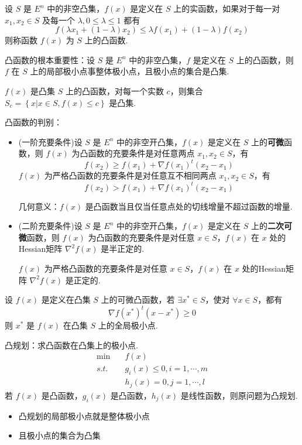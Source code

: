 \begin{note}
    设 $S$ 是 $E^n$ 中的非空凸集，$f(x)$ 是定义在 $S$ 上的实函数，如果对于每一对 $x_1, x_2 \in S$ 及每一个 $\lambda, 0\le \lambda \le 1$ 都有 \[f(\lambda x_1 + (1 - \lambda)x_2) \le \lambda f(x_1) + (1 - \lambda)f(x_2)\]
    则称函数 $f(x)$ 为 $S$ 上的凸函数.

    凸函数的根本重要性：设 $S$ 是 $E^n$ 中的非空凸集，$f$ 是定义在 $S$ 上的凸函数，则 $f$ 在 $S$ 上的局部极小点事整体极小点，且极小点的集合是凸集.
\end{note}

\begin{note}
    $f(x)$ 是凸集 $S$ 上的凸函数，对每一个实数 $c$，则集合 $S_c = \left\{x | x \in S, f(x) \le c\right\}$ 是凸集.
\end{note}

\begin{note}
    凸函数的判别：
    \begin{itemize}
        \item (一阶充要条件)设 $S$ 是 $E^n$ 中的非空开凸集，$f(x)$ 是定义在 $S$ 上的\textbf{可微}函数，则 $f(x)$ 为凸函数的充要条件是对任意两点 $x_1, x_2 \in S$，有 \[f(x_2) \ge f(x_1) + \nabla f(x_1)^t(x_2 - x_1)\]
        $f(x)$ 为严格凸函数的充要条件是对任意互不相同两点 $x_1, x_2 \in S$，有 \[f(x_2) > f(x_1) + \nabla f(x_1)^t(x_2 - x_1)\]

        几何意义：$f(x)$ 是凸函数当且仅当任意点处的切线增量不超过函数的增量.
        \item (二阶充要条件)设 $S$ 是 $E^n$ 中的非空开凸集，$f(x)$ 是定义在 $S$ 上的\textbf{二次可微}函数，则 $f(x)$ 为凸函数的充要条件是对任意 $x \in S$，$f(x)$ 在 $x$ 处的Hessian矩阵 $\nabla ^2f(x)$ 是半正定的.
        
        $f(x)$ 为严格凸函数的充要条件是对任意 $x \in S$，$f(x)$ 在 $x$ 处的Hessian矩阵 $\nabla ^2f(x)$ 是正定的.
    \end{itemize}
\end{note}

\begin{note}
    设 $f(x)$ 是定义在凸集 $S$ 上的可微凸函数，若 $\exists x^* \in S$，使对 $\forall x \in S$，都有 \[\nabla f(x^*)^t(x - x^*) \ge 0\]
    则 $x^*$ 是 $f(x)$ 在凸集 $S$ 上的全局极小点.
\end{note}

\begin{note}
    凸规划：求凸函数在凸集上的极小点.
    \begin{align*}
        \min \quad &f(x)\\ 
        s.t. \quad &g_{i}(x) \le 0, i=1, \cdots, m \\  
        &h_{j}(x)=0, j=1, \cdots, l 
    \end{align*}
    若 $f(x)$ 是凸函数，$g_i(x)$ 是凸函数，$h_j(x)$ 是线性函数，则原问题为凸规划.
    \begin{itemize} 
        \item 凸规划的局部极小点就是整体极小点
        \item 且极小点的集合为凸集
    \end{itemize}
\end{note}
